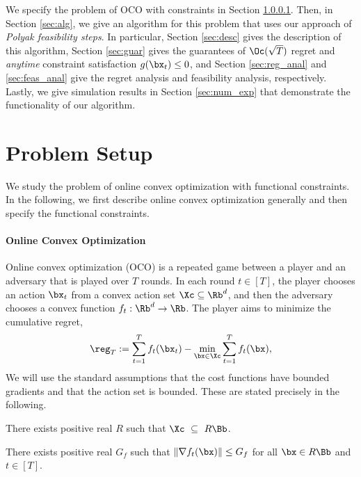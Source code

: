 We specify the problem of OCO with constraints in Section \ref{sec:prob}.
Then, in Section \ref{sec:alg}, we give an algorithm for this problem that uses our approach of \emph{Polyak feasibility steps}.
In particular, Section \ref{sec:desc} gives the description of this algorithm, Section \ref{sec:guar} gives the guarantees of $\Oc(\sqrt{T})$ regret and \emph{anytime} constraint satisfaction $g(\bx_t) \leq 0$, and Section \ref{sec:reg_anal} and \ref{sec:feas_anal} give the regret analysis and feasibility analysis, respectively.
Lastly, we give simulation results in Section \ref{sec:num_exp} that demonstrate the functionality of our algorithm.

\section{Problem Setup}

We study the problem of online convex optimization with functional constraints.
In the following, we first describe online convex optimization generally and then specify the functional constraints.

\paragraph{Online Convex Optimization}

\label{sec:prob}

Online convex optimization (OCO) is a repeated game between a player and an adversary that is played over $T$ rounds.
In each round $t \in [T]$, the player chooses an action $\bx_t$ from a convex action set $\Xc \subseteq \Rb^d$, and then the adversary chooses a convex function $f_t : \Rb^d \rightarrow \Rb$.
The player aims to minimize the cumulative regret,
\begin{equation*}
    \reg_T := \sum_{t=1}^{T} f_t (\bx_t) - \min_{\bx \in \Xc}\sum_{t=1}^{T} f_t (\bx),
\end{equation*}
We will use the standard assumptions that the cost functions have bounded gradients and that the action set is bounded. These are stated precisely in the following.

\begin{assumption}
    \label{ass:feas}
    There exists positive real $R$ such that $\Xc~\subseteq~R \Bb$.
\end{assumption}

\begin{assumption}
    \label{ass:stand}
    There exists positive real $G_f$ such that $\| \nabla f_t(\bx) \| \leq G_f$ for all $\bx \in R \Bb$ and $t \in [T]$.
\end{assumption}

